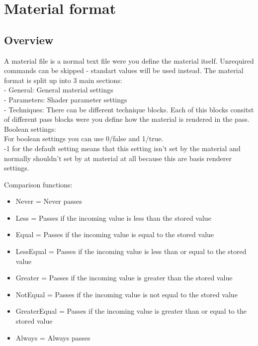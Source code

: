 \section{Material format}




\subsection{Overview}
A material file is a normal text file were you define the material itself. Unrequired commands can
be skipped - standart values will be used instead. The material format is split up into 3 main sections:\\
- General: General material settings\\
- Parameters: Shader parameter settings\\
- Techniques: There can be different technique blocks. Each of this blocks consitst of different pass blocks
  were you define how the material is rendered in the pass.\\



Boolean settings:\\
For boolean settings you can use 0/false and 1/true.\\

-1 for the default setting means that this setting isn't set by the material and
normally shouldn't set by at material at all because this are basis renderer settings.

Comparison functions:\\
\begin{itemize}
\item{Never        = Never passes}
\item{Less         = Passes if the incoming value is less than the stored value}
\item{Equal        = Passes if the incoming value is equal to the stored value}
\item{LessEqual    = Passes if the incoming value is less than or equal to the stored value}
\item{Greater      = Passes if the incoming value is greater than the stored value}
\item{NotEqual     = Passes if the incoming value is not equal to the stored value}
\item{GreaterEqual = Passes if the incoming value is greater than or equal to the stored value}
\item{Always       = Always passes}
\end{itemize}


